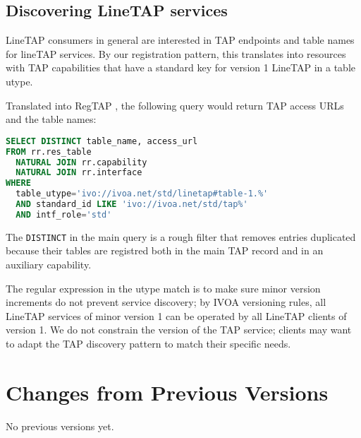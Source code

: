\documentclass[11pt,a4paper]{ivoa}
\begin{document}
\subsection{Discovering LineTAP services}

LineTAP consumers in general are interested in TAP endpoints and table names for
lineTAP services.  By our registration pattern, this translates into
resources with TAP capabilities that have a standard key for version 1
LineTAP in a table utype.

Translated into RegTAP \citep{2019ivoa.spec.1011D}, the following query
would return TAP access URLs and the table names:

\begin{lstlisting}[language=SQL]
SELECT DISTINCT table_name, access_url
FROM rr.res_table
  NATURAL JOIN rr.capability
  NATURAL JOIN rr.interface
WHERE
  table_utype='ivo://ivoa.net/std/linetap#table-1.%'
  AND standard_id LIKE 'ivo://ivoa.net/std/tap%'
  AND intf_role='std'
\end{lstlisting}

The \texttt{DISTINCT} in the main query is a rough filter that removes
entries duplicated because their tables are registred both in the main
TAP record and in an auxiliary capability.

The regular expression in the utype match is to make sure minor version
increments do not prevent service discovery; by IVOA versioning rules,
all LineTAP services of minor version 1 can be operated by all LineTAP
clients of version 1.  We do not constrain the version of the TAP
service; clients may want to adapt the TAP discovery pattern to match
their specific needs.



\appendix
\section{Changes from Previous Versions}

No previous versions yet.



\end{document}
